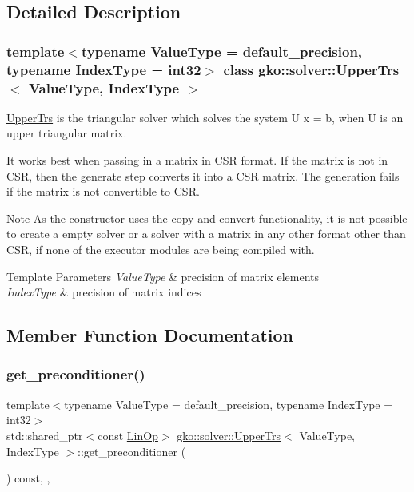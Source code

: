 \subsection{Detailed Description}
\subsubsection*{template$<$typename Value\+Type = default\+\_\+precision, typename Index\+Type = int32$>$\newline
class gko\+::solver\+::\+Upper\+Trs$<$ Value\+Type, Index\+Type $>$}

\hyperlink{classgko_1_1solver_1_1UpperTrs}{Upper\+Trs} is the triangular solver which solves the system U x = b, when U is an upper triangular matrix. 

It works best when passing in a matrix in C\+SR format. If the matrix is not in C\+SR, then the generate step converts it into a C\+SR matrix. The generation fails if the matrix is not convertible to C\+SR.

\begin{DoxyNote}{Note}
As the constructor uses the copy and convert functionality, it is not possible to create a empty solver or a solver with a matrix in any other format other than C\+SR, if none of the executor modules are being compiled with.
\end{DoxyNote}

\begin{DoxyTemplParams}{Template Parameters}
{\em Value\+Type} & precision of matrix elements \\
\hline
{\em Index\+Type} & precision of matrix indices \\
\hline
\end{DoxyTemplParams}


\subsection{Member Function Documentation}
\mbox{\label{classgko_1_1solver_1_1UpperTrs_ac9e8b508f5319d7a273ebb76b22f3349}} 
\subsubsection{\texorpdfstring{get\+\_\+preconditioner()}{get\_preconditioner()}}
{\footnotesize\ttfamily template$<$typename Value\+Type  = default\+\_\+precision, typename Index\+Type  = int32$>$ \\
std\+::shared\+\_\+ptr$<$const \hyperlink{classgko_1_1LinOp}{Lin\+Op}$>$ \hyperlink{classgko_1_1solver_1_1UpperTrs}{gko\+::solver\+::\+Upper\+Trs}$<$ Value\+Type, Index\+Type $>$\+::get\+\_\+preconditioner (\begin{DoxyParamCaption}{ }\end{DoxyParamCaption}) const\hspace{0.3cm}{\ttfamily [inline]}, {\ttfamily [override]}, {\ttfamily [virtual]}}



